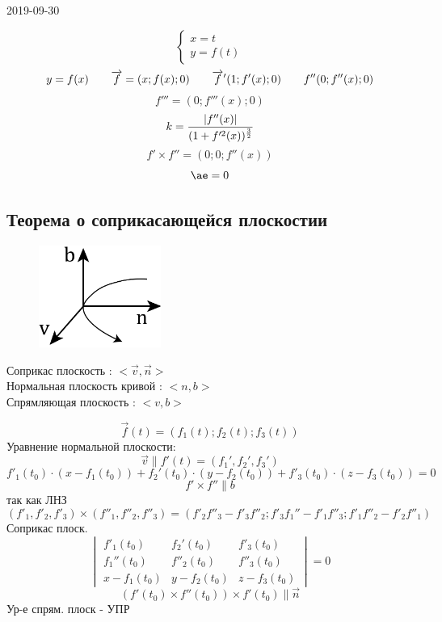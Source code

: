 \documentclass[main]{subfiles}
\begin{document}
\begin{lect} {2019-09-30}
		\begin{Example}
			\[\begin{cases}
					x = t\\
					y = f(t)
			\end{cases}\]
			\[y = f(x) \quad\quad \overrightarrow{f} = (x; f(x); 0) \quad\quad \overrightarrow{f}'(1; f'(x); 0) \quad\quad f''(0; f''(x); 0)\]
			\[f'''= (0; f'''(x); 0)\]
			\[k = \frac{\left|f''(x)\right|}{(1 + f'^2(x))^{\frac{3}{2}} }\]
			\[f' \times f'' = (0; 0; f''(x))\]
			\[\ae = 0\]
		\end{Example}

\subsection{Теорема о соприкасающейся плоскостии}

		\begin{definition}
			\begin{figure}[H]
			    \includegraphics[width=4cm]{pics/4_1.png}
			    \centering
			\end{figure}

		    Соприкас плоскость : $<\vec{v}, \vec{n}>$\\
			Нормальная плоскость кривой : $<n, b>$\\
			Спрямляющая плоскость : $<v, b>$
		\end{definition}

		\begin{Theorem}
			\[\vec{f}(t) = (f_1(t); f_2(t); f_3(t))\]
			Уравнение нормальной плоскости:
			\[\vec{v} \parallel f'(t) = (f_1', f_2', f_3')\]
            \[f'_1(t_0) \cdot(x - f_1(t_0)) +
			f_2'(t_0) \cdot (y - f_2(t_0)) + f'_3(t_0) \cdot (z - f_3(t_0)) = 0\]
			\[f' \times f'' \parallel b\]
			так как ЛНЗ
			\[(f'_1, f'_2, f'_3) \times (f''_1, f''_2, f''_3) = (f'_2 f''_3 - f'_3 f''_2;
			f'_3 f_1'' - f'_1 f''_3; f'_1 f''_2 - f'_2 f''_1)\]
			Соприкас плоск.
			\[\begin{vmatrix}
				f'_1(t_0) & f_2'(t_0) & f'_3(t_0)\\
				f_1''(t_0) & f''_2(t_0) & f''_3(t_0)\\
				x - f_1(t_0) & y - f_2(t_0) & z - f_3(t_0)
			\end{vmatrix} = 0\]
			\[(f'(t_0) \times f''(t_0)) \times f'(t_0) \parallel \vec{n}\]
			Ур-е спрям. плоск - УПР
		\end{Theorem}


\end{lect}
\end{document}

